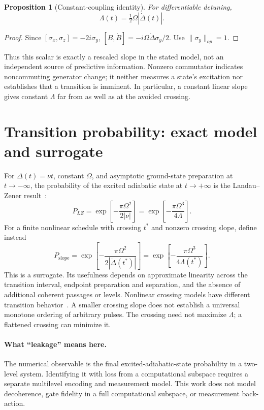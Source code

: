 \documentclass[11pt]{article}
\newtheorem{proposition}{Proposition}
\begin{document}
\begin{proposition}[Constant-coupling identity]
For differentiable detuning,
\begin{equation}
 \Lambda(t)=\tfrac12\Omega|\dot\Delta(t)|. \label{eq:identity}
\end{equation}
\end{proposition}
\begin{proof}
Since $[\sigma_x,\sigma_z]=-2i\sigma_y$,
$[B,\dot B]=-i\Omega\dot\Delta\sigma_y/2$. Use
$\|\sigma_y\|_{op}=1$.
\end{proof}
Thus this scalar is exactly a rescaled slope in the stated model, not an
independent source of predictive information. Nonzero commutator indicates
noncommuting generator change; it neither measures a state's excitation nor
establishes that a transition is imminent. In particular, a constant linear
slope gives constant $\Lambda$ far from as well as at the avoided crossing.

\section{Transition probability: exact model and surrogate}
For $\Delta(t)=\nu t$, constant $\Omega$, and asymptotic ground-state
preparation at $t\to-\infty$, the probability of the excited adiabatic state
at $t\to+\infty$ is the Landau--Zener result~\cite{zener1932}:
\begin{equation}
 P_{LZ}=\exp\!\left[-\frac{\pi\Omega^2}{2|\nu|}\right]
        =\exp\!\left[-\frac{\pi\Omega^3}{4\Lambda}\right].
 \label{eq:lz}
\end{equation}
For a finite nonlinear schedule with crossing $t^*$ and nonzero crossing
slope, define instead
\begin{equation}
 P_{\mathrm{slope}}=
 \exp\!\left[-\frac{\pi\Omega^2}{2|\dot\Delta(t^*)|}\right]
 =\exp\!\left[-\frac{\pi\Omega^3}{4\Lambda(t^*)}\right].
 \label{eq:surrogate}
\end{equation}
This is a surrogate. Its usefulness depends on approximate linearity across
the transition interval, endpoint preparation and separation, and the absence
of additional coherent passages or levels. Nonlinear crossing models have
different transition behavior~\cite{vitanov1999}. A smaller crossing slope
does not establish a universal monotone ordering of arbitrary pulses.
The crossing need not maximize $\Lambda$; a flattened crossing can minimize it.

\paragraph{What ``leakage'' means here.}
The numerical observable is the final excited-adiabatic-state probability
in a two-level system. Identifying it with loss from a computational subspace
requires a separate multilevel encoding and measurement model. This work does
not model decoherence, gate fidelity in a full computational subspace, or
measurement back-action.
\end{document}

